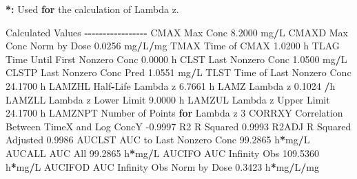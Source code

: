 \documentclass[
  10pt,
]{krantz}
\makeatletter
\newenvironment{Shaded}{\begin{snugshade}}{\end{snugshade}}
\newcommand{\ControlFlowTok}[1]{\textcolor[rgb]{0.13,0.29,0.53}{\textbf{#1}}}
\newcommand{\DecValTok}[1]{\textcolor[rgb]{0.00,0.00,0.81}{#1}}
\newcommand{\ErrorTok}[1]{\textcolor[rgb]{0.64,0.00,0.00}{\textbf{#1}}}
\newcommand{\FloatTok}[1]{\textcolor[rgb]{0.00,0.00,0.81}{#1}}
\newcommand{\NormalTok}[1]{#1}
\newcommand{\OperatorTok}[1]{\textcolor[rgb]{0.81,0.36,0.00}{\textbf{#1}}}
\newcommand{\StringTok}[1]{\textcolor[rgb]{0.31,0.60,0.02}{#1}}
\newenvironment{kframe}{%
\medskip{}
\setlength{\fboxsep}{.8em}
 \def\at@end@of@kframe{}%
 \ifinner\ifhmode%
  \def\at@end@of@kframe{\end{minipage}}%
  \begin{minipage}{\columnwidth}%
 \fi\fi%
 \def\FrameCommand##1{\hskip\@totalleftmargin \hskip-\fboxsep
 \colorbox{shadecolor}{##1}\hskip-\fboxsep
     \hskip-\linewidth \hskip-\@totalleftmargin \hskip\columnwidth}%
 \MakeFramed {\advance\hsize-\width
   \@totalleftmargin\z@ \linewidth\hsize
   \@setminipage}}%
 {\par\unskip\endMakeFramed%
 \at@end@of@kframe}
\renewenvironment{Shaded}{\begin{kframe}}{\end{kframe}}
\makeatother
\begin{document}
\begin{Shaded}
\begin{Highlighting}[]
\OperatorTok{*}\ErrorTok{:}\StringTok{ }\NormalTok{Used }\ControlFlowTok{for}\NormalTok{ the calculation of Lambda z.}


\NormalTok{Calculated Values}
\OperatorTok{{-}{-}{-}{-}{-}{-}{-}{-}{-}{-}{-}{-}{-}{-}{-}{-}{-}}
\NormalTok{CMAX       Max Conc                                        }\FloatTok{8.2000}\NormalTok{ mg}\OperatorTok{/}\NormalTok{L}
\NormalTok{CMAXD      Max Conc Norm by Dose                           }\FloatTok{0.0256}\NormalTok{ mg}\OperatorTok{/}\NormalTok{L}\OperatorTok{/}\NormalTok{mg}
\NormalTok{TMAX       Time of CMAX                                    }\FloatTok{1.0200}\NormalTok{ h}
\NormalTok{TLAG       Time Until First Nonzero Conc                   }\FloatTok{0.0000}\NormalTok{ h}
\NormalTok{CLST       Last Nonzero Conc                               }\FloatTok{1.0500}\NormalTok{ mg}\OperatorTok{/}\NormalTok{L}
\NormalTok{CLSTP      Last Nonzero Conc Pred                          }\FloatTok{1.0551}\NormalTok{ mg}\OperatorTok{/}\NormalTok{L}
\NormalTok{TLST       Time of Last Nonzero Conc                      }\FloatTok{24.1700}\NormalTok{ h}
\NormalTok{LAMZHL     Half}\OperatorTok{{-}}\NormalTok{Life Lambda z                              }\FloatTok{6.7661}\NormalTok{ h}
\NormalTok{LAMZ       Lambda z                                        }\FloatTok{0.1024} \OperatorTok{/}\NormalTok{h}
\NormalTok{LAMZLL     Lambda z Lower Limit                            }\FloatTok{9.0000}\NormalTok{ h}
\NormalTok{LAMZUL     Lambda z Upper Limit                           }\FloatTok{24.1700}\NormalTok{ h}
\NormalTok{LAMZNPT    Number of Points }\ControlFlowTok{for}\NormalTok{ Lambda z                   }\DecValTok{3}
\NormalTok{CORRXY     Correlation Between TimeX and Log ConcY        }\FloatTok{{-}0.9997} 
\NormalTok{R2         R Squared                                       }\FloatTok{0.9993} 
\NormalTok{R2ADJ      R Squared Adjusted                              }\FloatTok{0.9986} 
\NormalTok{AUCLST     AUC to Last Nonzero Conc                       }\FloatTok{99.2865}\NormalTok{ h}\OperatorTok{*}\NormalTok{mg}\OperatorTok{/}\NormalTok{L}
\NormalTok{AUCALL     AUC All                                        }\FloatTok{99.2865}\NormalTok{ h}\OperatorTok{*}\NormalTok{mg}\OperatorTok{/}\NormalTok{L}
\NormalTok{AUCIFO     AUC Infinity Obs                              }\FloatTok{109.5360}\NormalTok{ h}\OperatorTok{*}\NormalTok{mg}\OperatorTok{/}\NormalTok{L}
\NormalTok{AUCIFOD    AUC Infinity Obs Norm by Dose                   }\FloatTok{0.3423}\NormalTok{ h}\OperatorTok{*}\NormalTok{mg}\OperatorTok{/}\NormalTok{L}\OperatorTok{/}\NormalTok{mg}

\end{Highlighting}
\end{Shaded}
\end{document}
